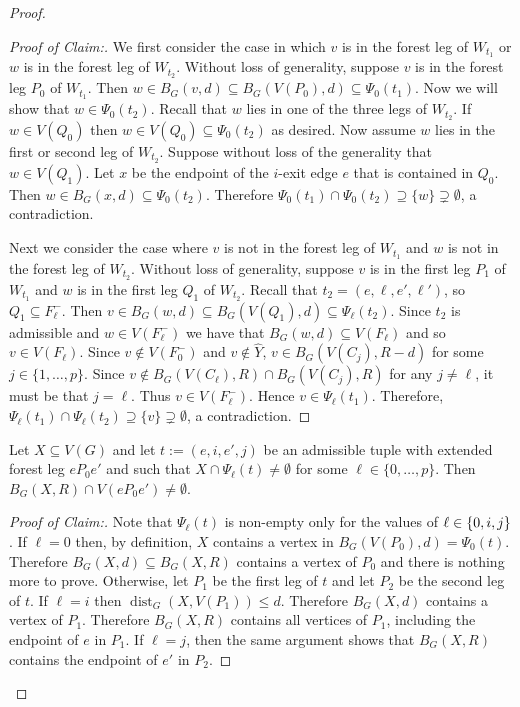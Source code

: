 \documentclass{patmorin}
\newcommand{\pat}[1]{\textcolor{Blue}{[Pat: #1]}}
\newcommand{\gwen}[1]{\textcolor{Purple}{Gwen: #1}}
\newenvironment{clmproof}{\begin{proof}[Proof of Claim:]\renewcommand{\qedsymbol}{\rule{1ex}{1ex}}}{\end{proof}}
\DeclareMathOperator{\dist}{dist}
\DeclarePairedDelimiter\set{\{}{\}}
\begin{document}
\begin{proof}
\begin{clmproof}
  We first consider the case in which $v$ is in the forest leg of $W_{t_1}$ or $w$ is in the forest leg of $W_{t_2}$.   Without loss of generality, suppose $v$ is in the forest leg $P_0$ of $W_{t_1}$. 
  Then $w\in B_G(v,d)\subseteq B_G(V(P_0),d)\subseteq\Psi_0(t_1)$.  Now we will show that $w\in \Psi_0(t_2)$.   Recall that $w$ lies in one of the three legs of $W_{t_2}$. 
  If $w\in V(Q_0)$ then $w\in V(Q_0)\subseteq \Psi_0(t_2)$ as desired. 
  Now assume $w$ lies in the first or second leg of $W_{t_2}$.
  Suppose without loss of the generality that $w\in V(Q_1)$. 
  Let $x$ be the endpoint of the $i$-exit edge $e$ that is contained in $Q_0$.
  Then $w\in B_G(x,d)\subseteq\Psi_0(t_2)$.
  Therefore $\Psi_0(t_1)\cap\Psi_0(t_2)\supseteq\{w\}\supsetneq\emptyset$, a contradiction. 

  Next we consider the case where $v$ is not in the forest leg of $W_{t_1}$ and $w$ is not in the forest leg of $W_{t_2}$.  Without loss of generality, suppose $v$ is in the first leg $P_1$ of $W_{t_1}$ and $w$ is in the first leg $Q_1$ of $W_{t_2}$. 
  Recall that $t_2=(e,\ell,e',\ell')$, so $Q_1\subseteq F_\ell^-$. 
  Then $v\in B_G(w,d)\subseteq B_G(V(Q_1),d) \subseteq \Psi_\ell(t_2)$.  
  Since $t_2$ is admissible and $w\in V(F^-_\ell)$ we have that $B_G(w,d) \subseteq V(F_\ell)$ and so $v\in V(F_\ell)$. 
  Since $v\not\in V(F_0^-)$ and $v\not\in \widehat{Y}$, 
  $v\in B_G(V(C_j),R-d)$ for some $j\in\{1,\ldots,p\}$. 
  Since $v\notin B_G(V(C_\ell),R)\cap B_G(V(C_j),R)$ for any $j\neq \ell$, it must be that $j=\ell$. Thus $v\in V(F^-_\ell)$.  Hence $v\in\Psi_\ell(t_1)$.
  Therefore, $\Psi_\ell(t_1)\cap\Psi_\ell(t_2)\supseteq\{v\}\supsetneq \emptyset$, a contradiction. 
\end{clmproof}


\begin{clm}\label{hungarians_hit}
  Let $X\subseteq V(G)$ and let $t:=(e,i,e',j)$ be an admissible tuple with extended forest leg $eP_0e'$ and such that $X\cap \Psi_\ell(t)\neq\emptyset$ for some $\ell\in\{0,\ldots,p\}$.  Then $B_G(X,R)\cap V(eP_0e')\neq\emptyset$.
\end{clm}

\begin{clmproof}
  Note that $\Psi_{\ell}(t)$ is non-empty only for the values of $\ell\in\set{0,i,j}$. 
  If $\ell=0$ then, by definition, $X$ contains a vertex in $B_G(V(P_0),d)=\Psi_0(t)$.  Therefore $B_G(X,d)\subseteq B_G(X,R)$ contains a vertex of $P_0$ and there is nothing more to prove.
  Otherwise, let $P_1$ be the first leg of $t$ and let $P_2$ be the second leg of $t$.
  If $\ell=i$ then $\dist_G(X,V(P_1))\le d$.  Therefore $B_G(X,d)$ contains a vertex of $P_1$.  Therefore $B_G(X,R)$ contains all vertices of $P_1$, including the endpoint of $e$ in $P_1$.  If $\ell=j$, then the same argument shows that $B_G(X,R)$ contains the endpoint of $e'$ in $P_2$.
\end{clmproof}


\end{proof}
\end{document}
